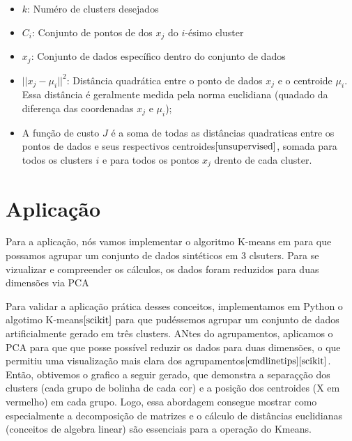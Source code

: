 \documentclass[a4paper,12pt]{article}
\begin{document}
 
\begin{itemize}
    \item $k$: Numéro de clusters desejados
    \item $C_i$: Conjunto de pontos de dos $x_j$ do $i$-ésimo cluster
    \item $x_j$: Conjunto de dados específico dentro do conjunto de dados
    \item $||x_j - \mu_i||^2$: Distância quadrática entre o ponto de dados $x_j$ e o centroide $\mu_i$. Essa distância é geralmente medida pela norma euclidiana (quadado da diferença das coordenadas $x_j$ e $\mu_i$); 
    \item A função de custo $J$ é a soma de todas as distâncias quadraticas entre os pontos de dados e seus respectivos centroides$\cite{unsupervised}$, somada para todos os clusters $i$ e para todos os pontos $x_j$ drento de cada cluster.
\end{itemize}


\newpage
\section{Aplicação}

Para a aplicação, nós vamos implementar o algoritmo K-means em  para que possamos agrupar um conjunto de dados sintéticos em 3 clsuters. Para se vizualizar e compreender os cálculos, os dados foram reduzidos para duas dimensões via PCA




Para validar a aplicação prática desses conceitos, implementamos em Python o algotimo K-means$\cite{scikit}$ para que pudéssemos agrupar um conjunto de dados artificialmente gerado em três clusters. ANtes do agrupamentos, aplicamos o PCA para que que posse possível reduzir os dados para duas dimensões, o que permitiu uma visualização mais clara dos agrupamentos$\cite{cmdlinetips}\cite{scikit}$. Então, obtivemos o grafico a seguir gerado, que demonstra a separaçção dos clusters (cada grupo de bolinha de cada cor) e a posição dos centroides (X em vermelho)  em cada grupo. Logo, essa abordagem consegue mostrar como especialmente a decomposição de matrizes e o cálculo de distâncias euclidianas (conceitos de algebra linear) são essenciais para a operação do Kmeans.
\end{document}
